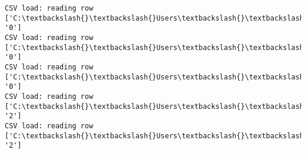 \documentclass[11pt]{article}
\begin{document}
\begin{Verbatim}[commandchars=\\\{\}]
CSV load: reading row ['C:\textbackslash{}\textbackslash{}Users\textbackslash{}\textbackslash{}AbhishekGangadhar\textbackslash{}\textbackslash{}Downloads\textbackslash{}\textbackslash{}ActionRecog\textbackslash{}\textbackslash{}ActionRecog\textbackslash{}\textbackslash{}DataSets\textbackslash{}\textbackslash{}UCF11\textbackslash{}\textbackslash{}action\_youtube\_naudio\textbackslash{}\textbackslash{}biking\textbackslash{}\textbackslash{}v\_biking\_06\textbackslash{}\textbackslash{}v\_biking\_06\_03.avi', '0']
CSV load: reading row ['C:\textbackslash{}\textbackslash{}Users\textbackslash{}\textbackslash{}AbhishekGangadhar\textbackslash{}\textbackslash{}Downloads\textbackslash{}\textbackslash{}ActionRecog\textbackslash{}\textbackslash{}ActionRecog\textbackslash{}\textbackslash{}DataSets\textbackslash{}\textbackslash{}UCF11\textbackslash{}\textbackslash{}action\_youtube\_naudio\textbackslash{}\textbackslash{}biking\textbackslash{}\textbackslash{}v\_biking\_06\textbackslash{}\textbackslash{}v\_biking\_06\_04.avi', '0']
CSV load: reading row ['C:\textbackslash{}\textbackslash{}Users\textbackslash{}\textbackslash{}AbhishekGangadhar\textbackslash{}\textbackslash{}Downloads\textbackslash{}\textbackslash{}ActionRecog\textbackslash{}\textbackslash{}ActionRecog\textbackslash{}\textbackslash{}DataSets\textbackslash{}\textbackslash{}UCF11\textbackslash{}\textbackslash{}action\_youtube\_naudio\textbackslash{}\textbackslash{}biking\textbackslash{}\textbackslash{}v\_biking\_06\textbackslash{}\textbackslash{}v\_biking\_06\_05.avi', '0']
CSV load: reading row ['C:\textbackslash{}\textbackslash{}Users\textbackslash{}\textbackslash{}AbhishekGangadhar\textbackslash{}\textbackslash{}Downloads\textbackslash{}\textbackslash{}ActionRecog\textbackslash{}\textbackslash{}ActionRecog\textbackslash{}\textbackslash{}DataSets\textbackslash{}\textbackslash{}UCF11\textbackslash{}\textbackslash{}action\_youtube\_naudio\textbackslash{}\textbackslash{}trampoline\_jumping\textbackslash{}\textbackslash{}v\_jumping\_04\textbackslash{}\textbackslash{}v\_jumping\_04\_01.avi', '2']
CSV load: reading row ['C:\textbackslash{}\textbackslash{}Users\textbackslash{}\textbackslash{}AbhishekGangadhar\textbackslash{}\textbackslash{}Downloads\textbackslash{}\textbackslash{}ActionRecog\textbackslash{}\textbackslash{}ActionRecog\textbackslash{}\textbackslash{}DataSets\textbackslash{}\textbackslash{}UCF11\textbackslash{}\textbackslash{}action\_youtube\_naudio\textbackslash{}\textbackslash{}trampoline\_jumping\textbackslash{}\textbackslash{}v\_jumping\_04\textbackslash{}\textbackslash{}v\_jumping\_04\_02.avi', '2']

\end{Verbatim}
\end{document}
